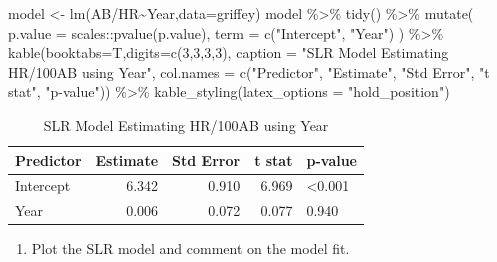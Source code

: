 \documentclass[
  11pt,
]{book}
\newenvironment{Shaded}{\begin{snugshade}}{\end{snugshade}}
\newcommand{\AttributeTok}[1]{\textcolor[rgb]{0.77,0.63,0.00}{#1}}
\newcommand{\DecValTok}[1]{\textcolor[rgb]{0.00,0.00,0.81}{#1}}
\newcommand{\FunctionTok}[1]{\textcolor[rgb]{0.00,0.00,0.00}{#1}}
\newcommand{\NormalTok}[1]{#1}
\newcommand{\OtherTok}[1]{\textcolor[rgb]{0.56,0.35,0.01}{#1}}
\newcommand{\SpecialCharTok}[1]{\textcolor[rgb]{0.00,0.00,0.00}{#1}}
\newcommand{\StringTok}[1]{\textcolor[rgb]{0.31,0.60,0.02}{#1}}
\providecommand{\tightlist}{%
  \setlength{\itemsep}{0pt}\setlength{\parskip}{0pt}}
\theoremstyle{definition}
\theoremstyle{definition}
\theoremstyle{definition}
\theoremstyle{definition}
\theoremstyle{remark}
\begin{document}
\begin{Shaded}
\begin{Highlighting}[]
\NormalTok{model }\OtherTok{\textless{}{-}} \FunctionTok{lm}\NormalTok{(}\StringTok{\textasciigrave{}}\AttributeTok{AB/HR}\StringTok{\textasciigrave{}}\SpecialCharTok{\textasciitilde{}}\NormalTok{Year,}\AttributeTok{data=}\NormalTok{griffey)}
\NormalTok{model }\SpecialCharTok{\%\textgreater{}\%} \FunctionTok{tidy}\NormalTok{() }\SpecialCharTok{\%\textgreater{}\%}
  \FunctionTok{mutate}\NormalTok{(}
    \AttributeTok{p.value =}\NormalTok{ scales}\SpecialCharTok{::}\FunctionTok{pvalue}\NormalTok{(p.value),}
    \AttributeTok{term =} \FunctionTok{c}\NormalTok{(}\StringTok{"Intercept"}\NormalTok{, }\StringTok{"Year"}\NormalTok{)}
\NormalTok{  ) }\SpecialCharTok{\%\textgreater{}\%}
  \FunctionTok{kable}\NormalTok{(}\AttributeTok{booktabs=}\NormalTok{T,}\AttributeTok{digits=}\FunctionTok{c}\NormalTok{(}\DecValTok{3}\NormalTok{,}\DecValTok{3}\NormalTok{,}\DecValTok{3}\NormalTok{,}\DecValTok{3}\NormalTok{), }
        \AttributeTok{caption =} \StringTok{"SLR Model Estimating HR/100AB using Year"}\NormalTok{,}
        \AttributeTok{col.names =} \FunctionTok{c}\NormalTok{(}\StringTok{"Predictor"}\NormalTok{, }\StringTok{"Estimate"}\NormalTok{, }\StringTok{"Std Error"}\NormalTok{, }\StringTok{"t stat"}\NormalTok{, }\StringTok{"p{-}value"}\NormalTok{)) }\SpecialCharTok{\%\textgreater{}\%}
  \FunctionTok{kable\_styling}\NormalTok{(}\AttributeTok{latex\_options =} \StringTok{"hold\_position"}\NormalTok{)}
\end{Highlighting}
\end{Shaded}

\begin{table}[!h]

\caption{\label{tab:unnamed-chunk-237}SLR Model Estimating HR/100AB using Year}
\centering
\begin{tabular}[t]{lrrrl}
\toprule
Predictor & Estimate & Std Error & t stat & p-value\\
\midrule
Intercept & 6.342 & 0.910 & 6.969 & <0.001\\
Year & 0.006 & 0.072 & 0.077 & 0.940\\
\bottomrule
\end{tabular}
\end{table}

\newpage

\begin{enumerate}
\def\labelenumi{(\alph{enumi})}
\setcounter{enumi}{2}
\tightlist
\item
  Plot the SLR model and comment on the model fit.
\end{enumerate}
\end{document}
